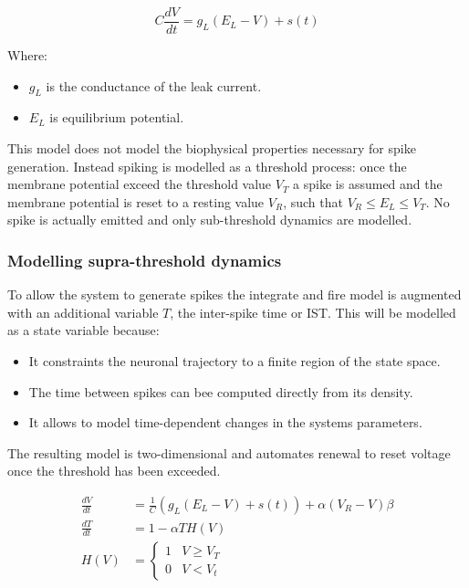 		$$C\frac{dV}{dt} = g_L(E_L-V)+s(t)$$

		Where:

		\begin{itemize}
			\item $g_L$ is the conductance of the leak current.
			\item $E_L$ is equilibrium potential.
		\end{itemize}

		This model does not model the biophysical properties necessary for spike generation.
		Instead spiking is modelled as a threshold process: once the membrane potential exceed the threshold value $V_T$ a spike is assumed and the membrane potential is reset to a resting value $V_R$, such that $V_R\le E_L\le V_T$.
		No spike is actually emitted and only sub-threshold dynamics are modelled.

		\subsubsection{Modelling supra-threshold dynamics}
		To allow the system to generate spikes the integrate and fire model is augmented with an additional variable $T$, the inter-spike time or IST.
		This will be modelled as a state variable because:

		\begin{itemize}
			\item It constraints the neuronal trajectory to a finite region of the state space.
			\item The time between spikes can bee computed directly from its density.
			\item It allows to model time-dependent changes in the systems parameters.
		\end{itemize}

		The resulting model is two-dimensional and automates renewal to reset voltage once the threshold has been exceeded.


		\begin{equation}
			\begin{aligned}
				\frac{dV}{dt} &= \frac{1}{C}(g_L(E_L-V)+s(t)) + \alpha(V_R-V)\beta\\
				\frac{dT}{dt} &= 1-\alpha TH(V)\\
				H(V) &= \begin{cases}1 & V\ge V_T\\0&V < V_t\end{cases}
				\label{eqs:supra-threshold}
			\end{aligned}
		\end{equation}

